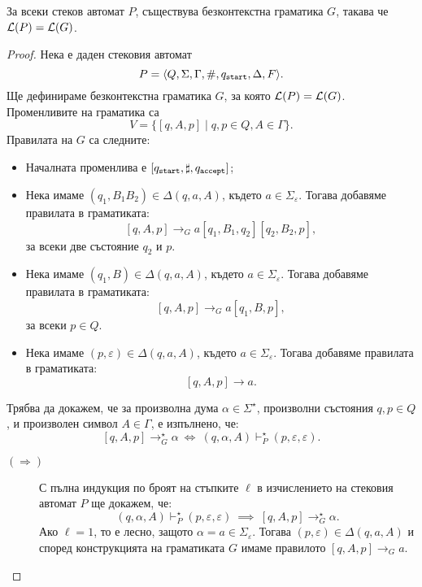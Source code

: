 \begin{framed}
  \begin{lemma}
    За всеки стеков автомат $P$, съществува безконтекстна граматика $G$, такава че $\mathcal{L}(P) = \mathcal{L}(G)$.
  \end{lemma}
\end{framed}
\begin{proof}
  Нека е даден стековия автомат
  \[P = \langle{Q,\Sigma,\Gamma,\#,q_{\texttt{start}},\Delta,F}\rangle.\]
  Ще дефинираме безконтекстна граматика $G$, за която $\mathcal{L}(P) = \mathcal{L}(G)$.
  Променливите на граматика са 
  \[V = \{[q,A,p] \mid q,p \in Q, A \in \Gamma\}.\]
  Правилата на $G$ са следните:
  \begin{itemize}
  \item
    Началната променлива е $[q_{\texttt{start}},\sharp,q_{\texttt{accept}}]$;
  \item
    Нека имаме $(q_1,B_1B_2) \in \Delta(q, a, A)$, където $a \in \Sigma_\varepsilon$.
    Тогава добавяме правилата в граматиката:
    \[[q,A,p] \to_G a[q_1,B_1,q_2][q_2,B_2,p],\]
    за всеки две състояние $q_2$ и $p$.
  \item
    Нека имаме $(q_1,B) \in \Delta(q, a, A)$, където $a \in \Sigma_\varepsilon$.
    Тогава добавяме правилата в граматиката:
    \[[q,A,p] \to_G a[q_1,B,p],\]
    за всеки $p \in Q$.
  \item
    Нека имаме $(p,\varepsilon) \in \Delta(q,a,A)$, където $a \in \Sigma_\varepsilon$.
    Тогава добавяме правилата в граматиката:
    \[[q,A,p] \to a.\]
  \end{itemize}
  Трябва да докажем, че за произволна дума $\alpha \in \Sigma^\star$, произволни състояния $q,p \in Q$,
  и произволен символ $A \in \Gamma$, е изпълнено, че:
  \[[q,A,p] \rightarrow^\star_G \alpha\ \Leftrightarrow\ (q,\alpha,A) \vdash^\star_{P} (p,\varepsilon,\varepsilon).\]
  \begin{description}
  \item[$(\Rightarrow)$]
    С пълна индукция по броят на стъпките $\ell$ в изчислението на стековия автомат $P$ ще докажем, че:
    \[(q,\alpha,A) \vdash^\star_P (p,\varepsilon,\varepsilon)\ \implies\ [q,A,p] \to^\star_G \alpha.\]
    Ако $\ell = 1$, то е лесно, защото $\alpha = a \in \Sigma_\varepsilon$.
    Тогава $(p,\varepsilon) \in \Delta(q,a,A)$ и според конструкцията на граматиката $G$ имаме правилото $[q,A,p] \to_G a$.
    

\end{description}
\end{proof}
